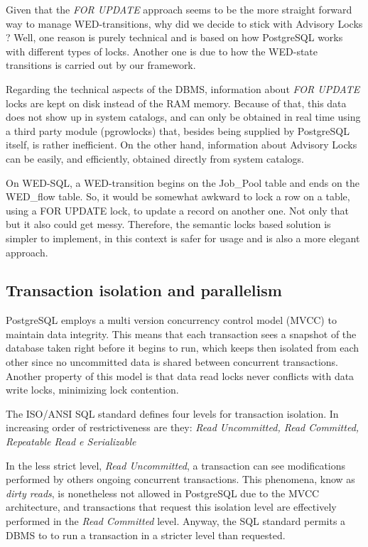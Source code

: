 \documentclass[conference]{IEEEtran}
\begin{document}
\par Given that the \emph{FOR UPDATE} approach seems to be the more straight forward way to manage WED-transitions, why
did we decide to stick with Advisory Locks ? Well, one reason is purely technical and is based on how PostgreSQL
works with different types of locks. Another one is due to how the WED-state transitions is carried out by our framework. 

\par Regarding the technical aspects of the DBMS, information about \emph{FOR UPDATE} locks are kept on disk instead of
the RAM memory. Because of that, this data does not show up in system catalogs, and can only be obtained in real time
using a third party module (pgrowlocks) that, besides being supplied by PostgreSQL itself, is rather inefficient. On the
other hand, information about Advisory Locks can be easily, and efficiently, obtained directly from system catalogs.  

\par On WED-SQL, a WED-transition begins on the Job\_Pool table and ends on the WED\_flow table. So, it would be somewhat
awkward to lock a row on a table, using a FOR UPDATE lock, to update a record on another one. Not only that but it also 
could get messy. Therefore, the semantic locks based solution is simpler to implement, in this context is safer for usage 
and is also a more elegant approach.   


\subsection{Transaction isolation and parallelism }

PostgreSQL employs a multi version concurrency control model (MVCC) to maintain data integrity. This means that each transaction
sees a snapshot of the database taken right before it begins to run, which keeps then isolated from each other since no uncommitted 
data is shared between concurrent transactions. Another property of this model is that data read locks never conflicts with
data write locks, minimizing lock contention.

\par The ISO/ANSI SQL standard defines four levels for transaction isolation. In increasing order of restrictiveness are they: 
\emph{Read Uncommitted, Read Committed, Repeatable Read e Serializable}

\par In the less strict level, \emph{Read Uncommitted}, a transaction can see modifications performed by others ongoing 
concurrent transactions. This phenomena, know as \emph{dirty reads}, is nonetheless not allowed in PostgreSQL due to the
MVCC architecture, and transactions that request this isolation level are effectively performed in the \emph{Read Committed}
level. Anyway, the SQL standard permits a DBMS to to run a transaction in a stricter level than requested.
\end{document}

